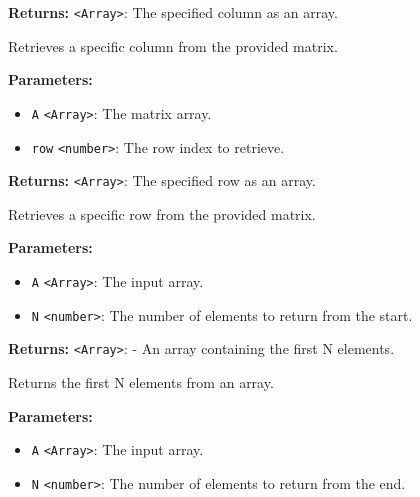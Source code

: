 \documentclass[12pt,a4paper]{article}
\begin{document}
\noindent \textbf{Returns:} \texttt{<Array>}: The specified column as an array.

\noindent Retrieves a specific column from the provided matrix.

\vspace{5mm}
\noindent {}


\noindent \textbf{Parameters:}
\begin{itemize}
  \item \texttt{A} \texttt{<Array>}: The matrix array.
  \item \texttt{row} \texttt{<number>}: The row index to retrieve.
\end{itemize}

\noindent \textbf{Returns:} \texttt{<Array>}: The specified row as an array.

\noindent Retrieves a specific row from the provided matrix.

\vspace{5mm}
\noindent {}


\noindent \textbf{Parameters:}
\begin{itemize}
  \item \texttt{A} \texttt{<Array>}: The input array.
  \item \texttt{N} \texttt{<number>}: The number of elements to return from the start.
\end{itemize}

\noindent \textbf{Returns:} \texttt{<Array>}: - An array containing the first N elements.

\noindent Returns the first N elements from an array.

\vspace{5mm}
\noindent {}


\noindent \textbf{Parameters:}
\begin{itemize}
  \item \texttt{A} \texttt{<Array>}: The input array.
  \item \texttt{N} \texttt{<number>}: The number of elements to return from the end.
\end{itemize}
\end{document}
